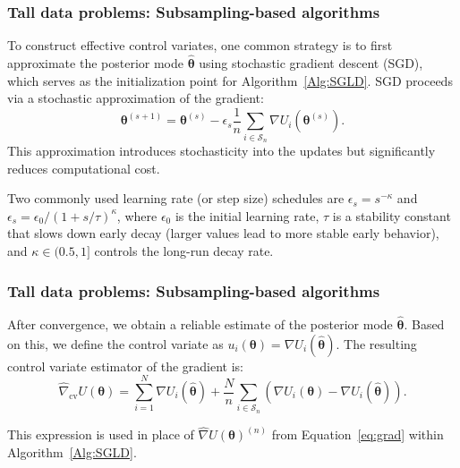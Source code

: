 \documentclass[12pt, compress]{beamer}
\begin{document}
\begin{frame}
	\frametitle{Tall data problems: Subsampling-based algorithms}
To construct effective control variates, one common strategy is to first approximate the posterior mode \( \hat{\boldsymbol{\theta}} \) using stochastic gradient descent (SGD), which serves as the initialization point for Algorithm~\ref{Alg:SGLD}. SGD proceeds via a stochastic approximation of the gradient:
\[
\boldsymbol{\theta}^{(s+1)} = \boldsymbol{\theta}^{(s)} - \epsilon_s \frac{1}{n} \sum_{i \in \mathcal{S}_n} \nabla U_i(\boldsymbol{\theta}^{(s)}).
\]
This approximation introduces stochasticity into the updates but significantly reduces computational cost.

Two commonly used learning rate (or step size) schedules are \( \epsilon_s = s^{-\kappa} \) and \( \epsilon_s = \epsilon_0 / (1 + s / \tau)^{\kappa} \), where \( \epsilon_0 \) is the initial learning rate, \( \tau \) is a stability constant that slows down early decay (larger values lead to more stable early behavior), and \( \kappa \in (0.5, 1] \) controls the long-run decay rate.
\end{frame}

\begin{frame}
	\frametitle{Tall data problems: Subsampling-based algorithms}
After convergence, we obtain a reliable estimate of the posterior mode \( \hat{\boldsymbol{\theta}} \). Based on this, we define the control variate as \( u_i(\boldsymbol{\theta}) = \nabla U_i(\hat{\boldsymbol{\theta}}) \). The resulting control variate estimator of the gradient is:
\[
\hat{\nabla}_{\text{cv}} U(\boldsymbol{\theta}) = \sum_{i=1}^N \nabla U_i(\hat{\boldsymbol{\theta}}) + \frac{N}{n} \sum_{i \in \mathcal{S}_n} \left( \nabla U_i(\boldsymbol{\theta}) - \nabla U_i(\hat{\boldsymbol{\theta}}) \right).
\]

This expression is used in place of \( \hat{\nabla} U(\boldsymbol{\theta})^{(n)} \) from Equation~\ref{eq:grad} within Algorithm~\ref{Alg:SGLD}.
\end{frame}
\end{document}
